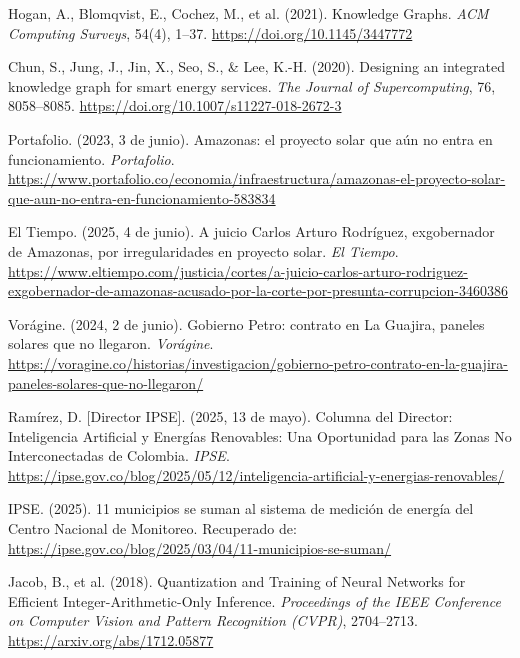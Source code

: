 \documentclass[12pt,letterpaper]{article}
\begin{document}
\begin{description}[style=nextline, leftmargin=0pt, labelindent=0pt, itemsep=6pt]
\item[Hogan et al. (2021)]
Hogan, A., Blomqvist, E., Cochez, M., et al. (2021). Knowledge Graphs. \textit{ACM Computing Surveys}, 54(4), 1--37. \url{https://doi.org/10.1145/3447772}

\item[Chun et al. (2020)]
Chun, S., Jung, J., Jin, X., Seo, S., \& Lee, K.-H. (2020). Designing an integrated knowledge graph for smart energy services. \textit{The Journal of Supercomputing}, 76, 8058--8085. \url{https://doi.org/10.1007/s11227-018-2672-3}

\item[Portafolio (2023)]
Portafolio. (2023, 3 de junio). Amazonas: el proyecto solar que a\'un no entra en funcionamiento. \textit{Portafolio}. \url{https://www.portafolio.co/economia/infraestructura/amazonas-el-proyecto-solar-que-aun-no-entra-en-funcionamiento-583834}

\item[El Tiempo (2025)]
El Tiempo. (2025, 4 de junio). A juicio Carlos Arturo Rodr\'iguez, exgobernador de Amazonas, por irregularidades en proyecto solar. \textit{El Tiempo}. \url{https://www.eltiempo.com/justicia/cortes/a-juicio-carlos-arturo-rodriguez-exgobernador-de-amazonas-acusado-por-la-corte-por-presunta-corrupcion-3460386}

\item[Vor\'agine (2024)]
Vor\'agine. (2024, 2 de junio). Gobierno Petro: contrato en La Guajira, paneles solares que no llegaron. \textit{Vor\'agine}. \url{https://voragine.co/historias/investigacion/gobierno-petro-contrato-en-la-guajira-paneles-solares-que-no-llegaron/}

\item[Ram\'irez (2025)]
Ram\'irez, D. [Director IPSE]. (2025, 13 de mayo). Columna del Director: Inteligencia Artificial y Energ\'ias Renovables: Una Oportunidad para las Zonas No Interconectadas de Colombia. \textit{IPSE}. \url{https://ipse.gov.co/blog/2025/05/12/inteligencia-artificial-y-energias-renovables/}

\item[IPSE (2025)]
IPSE. (2025). 11 municipios se suman al sistema de medici\'on de energ\'ia del Centro Nacional de Monitoreo. Recuperado de: \url{https://ipse.gov.co/blog/2025/03/04/11-municipios-se-suman/}

\item[Jacob et al. (2018)]
Jacob, B., et al. (2018). Quantization and Training of Neural Networks for Efficient Integer-Arithmetic-Only Inference. \textit{Proceedings of the IEEE Conference on Computer Vision and Pattern Recognition (CVPR)}, 2704--2713. \url{https://arxiv.org/abs/1712.05877}


\end{description}
\end{document}
